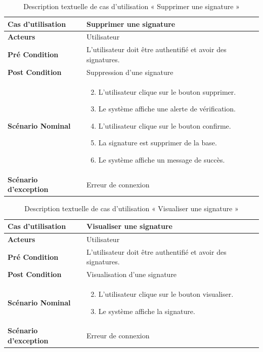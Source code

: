 \begin{longtable}{|p{5cm}|p{10cm}|}
  \caption{Description textuelle de cas d'utilisation « Supprimer une signature »} \label{tab:use_case_delete_signature} \\
\hline
\textbf{Cas d'utilisation}&Supprimer une signature\\
\hline
\textbf{Acteurs}&Utilisateur \\
\hline
\textbf{Pré Condition}&L'utilisateur doit être authentifié et avoir des signatures.\\
\hline
\textbf{Post Condition}&Suppression  d'une signature\\
\hline
\textbf{Scénario Nominal}&
\vspace{-\baselineskip}
\begin{enumerate}
    \setcounter{enumi}{1}
    \item L'utilisateur clique sur le bouton supprimer.
    \item Le système affiche une alerte de vérification.
    \item L'utilisateur clique sur le bouton confirme.
    \item La signature est supprimer de la base.
    \item Le système affiche un message de succès.
\end{enumerate}\\
\hline
\textbf{Scénario d'exception}&Erreur de connexion\\
\hline

\end{longtable}



\begin{longtable}{|p{5cm}|p{10cm}|}
  \caption{Description textuelle de cas d'utilisation « Visualiser une signature »} \label{tab:use_case_view_single_signature} \\
\hline
\textbf{Cas d'utilisation}&Visualiser une signature\\
\hline
\textbf{Acteurs}&Utilisateur \\
\hline
\textbf{Pré Condition}&L'utilisateur doit être authentifié et avoir des signatures.\\
\hline
\textbf{Post Condition}&Visualisation d'une signature\\
\hline
\textbf{Scénario Nominal}&
\vspace{-\baselineskip}
\begin{enumerate}
    \setcounter{enumi}{1}
    \item L'utilisateur clique sur le bouton visualiser.
    \item Le système affiche la signature.
\end{enumerate}\\
\hline
\textbf{Scénario d'exception}&Erreur de connexion\\
\hline

\end{longtable}

